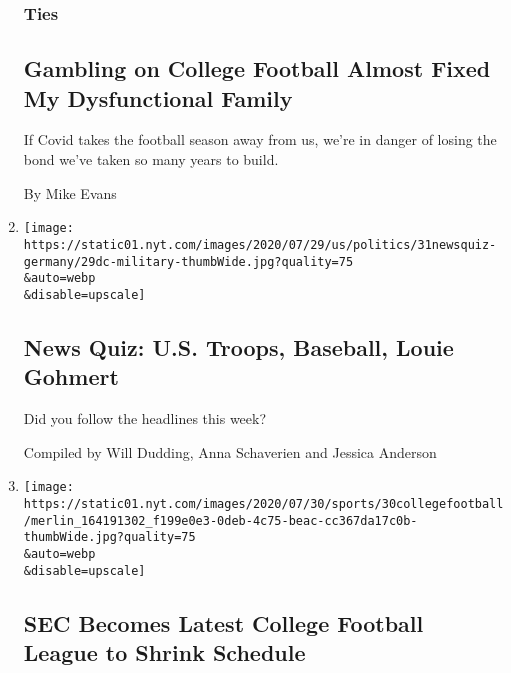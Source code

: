 \begin{enumerate}
  \hypertarget{ties}{%
  \subsubsection{Ties}\label{ties}}

  \hypertarget{gambling-on-college-football-almost-fixed-my-dysfunctional-family}{%
  \subsection{Gambling on College Football Almost Fixed My Dysfunctional
  Family}\label{gambling-on-college-football-almost-fixed-my-dysfunctional-family}}

  If Covid takes the football season away from us, we're in danger of
  losing the bond we've taken so many years to build.

  By Mike Evans
\item
  \href{/interactive/2020/07/31/briefing/troops-baseball-louie-gohmert-news-quiz.html}{}

  \texttt{[image: https://static01.nyt.com/images/2020/07/29/us/politics/31newsquiz-germany/29dc-military-thumbWide.jpg?quality=75\\\&auto=webp\\\&disable=upscale]}

  \hypertarget{news-quiz-us-troops-baseball-louie-gohmert}{%
  \subsection{News Quiz: U.S. Troops, Baseball, Louie
  Gohmert}\label{news-quiz-us-troops-baseball-louie-gohmert}}

  Did you follow the headlines this week?

  Compiled by Will Dudding, Anna Schaverien and Jessica Anderson
\item
  \href{/2020/07/30/sports/coronavirus-sec-schedule.html}{}

  \texttt{[image: https://static01.nyt.com/images/2020/07/30/sports/30collegefootball/merlin\_164191302\_f199e0e3-0deb-4c75-beac-cc367da17c0b-thumbWide.jpg?quality=75\\\&auto=webp\\\&disable=upscale]}

  \hypertarget{sec-becomes-latest-college-football-league-to-shrink-schedule}{%
  \subsection{SEC Becomes Latest College Football League to Shrink
  Schedule}\label{sec-becomes-latest-college-football-league-to-shrink-schedule}}


\end{enumerate}
